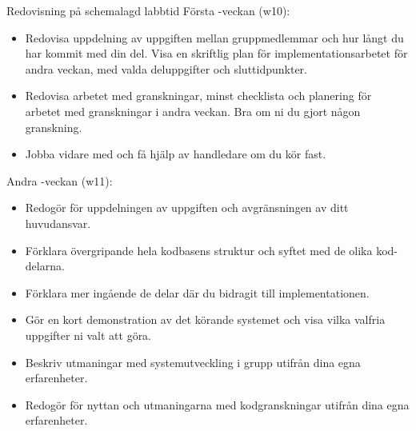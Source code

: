 


\begin{Slide}{Redovisning på schemalagd labbtid}
Första -veckan (w10):
\begin{itemize}\SlideFontTiny
\item Redovisa uppdelning av uppgiften mellan gruppmedlemmar och hur långt du har kommit med din del. Visa en skriftlig plan för implementationsarbetet för andra veckan, med valda deluppgifter och sluttidpunkter.
\item Redovisa arbetet med granskningar, minst checklista och planering för arbetet med granskningar i andra veckan. Bra om ni du gjort någon granskning.
\item Jobba vidare med  och få hjälp av handledare om du kör fast. 
\end{itemize}
Andra -veckan (w11):
\begin{itemize}\SlideFontTiny
\item Redogör för uppdelningen av uppgiften och avgränsningen av ditt huvudansvar.
\item Förklara övergripande hela kodbasens struktur och syftet med de olika kod-delarna.
\item Förklara mer ingående de delar där du bidragit till implementationen.
\item Gör en kort demonstration av det körande systemet och visa vilka valfria uppgifter ni valt att göra.
\item Beskriv utmaningar med systemutveckling i grupp utifrån dina egna erfarenheter.
\item Redogör för nyttan och utmaningarna med kodgranskningar utifrån dina egna erfarenheter.  
\end{itemize}
\end{Slide}


\fi
